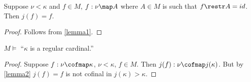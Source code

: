 \documentclass[oneside,12pt]{amsart}
\begin{document}
\begin{lemma}
\label{lemma2}
Suppose $\nu<\kappa$ and $f\in M$, $f:\nu \map A$ where $A\in M$ is such that $f\restr A = id$.
Then $j(f) = f$.
\end{lemma}
\begin{proof}
Follows from \ref{lemma1}.
\end{proof}

\begin{lemma}
$M\models$ ``$\kappa$ is a regular cardinal.''
\end{lemma}
\begin{proof}
Suppose $f:\nu\cofmap\kappa$, $\nu < \kappa$, $f\in M$. Then $j(f) : \nu \cofmap j(\kappa)$.
But by \ref{lemma2} $j(f) = f$ is not cofinal in $j(\kappa) > \kappa$.
\end{proof}
\end{document}
